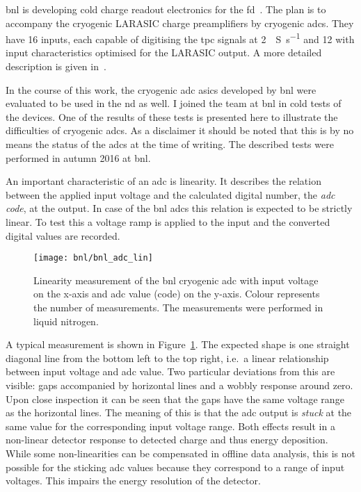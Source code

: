 \gls{bnl} is developing cold charge readout electronics for the \dune{} \gls{fd}~\cite{protodune-sp}.
The plan is to accompany the cryogenic LARASIC charge preamplifiers by cryogenic \glspl{adc}.
They have \num{16} inputs, each capable of digitising the \gls{tpc} signals at \SI{2}{\mega{}S\per\second} and \SI{12}{\bit} with input characteristics optimised for the LARASIC output.
A more detailed description is given in~\cite{bnl_adc}.

In the course of this work, the cryogenic \gls{adc} \glspl{asic} developed by \gls{bnl} were evaluated to be used in the \gls{nd} as well.
I joined the team at \gls{bnl} in cold tests of the devices.
One of the results of these tests is presented here to illustrate the difficulties of cryogenic \glspl{adc}.
As a disclaimer it should be noted that this is by no means the status of the \glspl{adc} at the time of writing.
The described tests were performed in autumn 2016 at \gls{bnl}.

An important characteristic of an \gls{adc} is linearity.
It describes the relation between the applied input voltage and the calculated digital number, the \emph{\gls{adc} code}, at the output.
In case of the \gls{bnl} \glspl{adc} this relation is expected to be strictly linear.
To test this a voltage ramp is applied to the input and the converted digital values are recorded.

\begin{figure}[htb]
	\centering
	\texttt{[image: bnl/bnl\_adc\_lin]}
	\caption[Linearity measurement of  cryogenic  ]{%
		Linearity measurement of the \acrshort{bnl} cryogenic \acrshort{adc}  with input voltage on the x-axis and \acrshort{adc} value (code) on the y-axis.
		Colour represents the number of measurements.
		The measurements were performed in liquid nitrogen.
	}
	\label{fig:bnl_adc_lin}
\end{figure}

A typical measurement is shown in Figure~\ref{fig:bnl_adc_lin}.
The expected shape is one straight diagonal line from the bottom left to the top right, i.e.\ a linear relationship between input voltage and \gls{adc} value.
Two particular deviations from this are visible: gaps accompanied by horizontal lines and a wobbly response around zero.
Upon close inspection it can be seen that the gaps have the same voltage range as the horizontal lines.
The meaning of this is that the \gls{adc} output is \emph{stuck} at the same value for the corresponding input voltage range.
Both effects result in a non-linear detector response to detected charge and thus energy deposition.
While some non-linearities can be compensated in offline data analysis, this is not possible for the sticking \gls{adc} values because they correspond to a range of input voltages.
This impairs the energy resolution of the detector.

